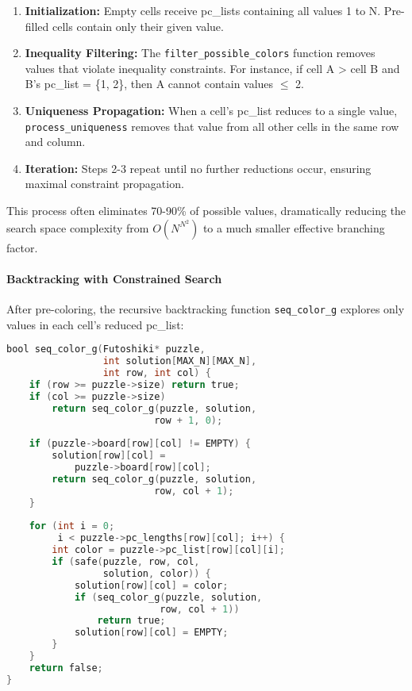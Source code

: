 \begin{enumerate}
    \item \textbf{Initialization:} Empty cells receive pc\_lists containing all values 1 to N. Pre-filled cells contain only their given value.
    
    \item \textbf{Inequality Filtering:} The \texttt{filter\_possible\_colors} function removes values that violate inequality constraints. For instance, if cell A > cell B and B's pc\_list = \{1, 2\}, then A cannot contain values $\leq$ 2.
    
    \item \textbf{Uniqueness Propagation:} When a cell's pc\_list reduces to a single value, \texttt{process\_uniqueness} removes that value from all other cells in the same row and column.
    
    \item \textbf{Iteration:} Steps 2-3 repeat until no further reductions occur, ensuring maximal constraint propagation.
\end{enumerate}

This process often eliminates 70-90\% of possible values, dramatically reducing the search space complexity from $O(N^{N^2})$ to a much smaller effective branching factor.

\paragraph{Backtracking with Constrained Search}
\label{par:backtrack_with_csp}
After pre-coloring, the recursive backtracking function \texttt{seq\_color\_g} explores only values in each cell's reduced pc\_list:

\begin{lstlisting}[language=C, caption=Sequential backtracking core]
bool seq_color_g(Futoshiki* puzzle, 
                 int solution[MAX_N][MAX_N], 
                 int row, int col) {
    if (row >= puzzle->size) return true;
    if (col >= puzzle->size) 
        return seq_color_g(puzzle, solution, 
                          row + 1, 0);
    
    if (puzzle->board[row][col] != EMPTY) {
        solution[row][col] = 
            puzzle->board[row][col];
        return seq_color_g(puzzle, solution, 
                          row, col + 1);
    }
    
    for (int i = 0; 
         i < puzzle->pc_lengths[row][col]; i++) {
        int color = puzzle->pc_list[row][col][i];
        if (safe(puzzle, row, col, 
                 solution, color)) {
            solution[row][col] = color;
            if (seq_color_g(puzzle, solution, 
                           row, col + 1))
                return true;
            solution[row][col] = EMPTY;
        }
    }
    return false;
}
\end{lstlisting}

